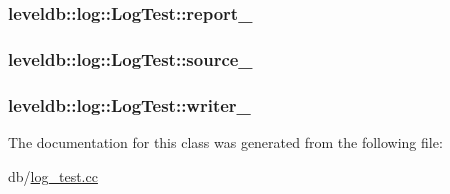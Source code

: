 \hypertarget{classleveldb_1_1log_1_1_log_test_a39e97d85a7494c9b8056c10e1124e374}{
\subsubsection[{report\-\_\-}]{ leveldb\-::log\-::\-Log\-Test\-::report\-\_\-\hspace{0.3cm}{\ttfamily [private]}}}\label{classleveldb_1_1log_1_1_log_test_a39e97d85a7494c9b8056c10e1124e374}
\hypertarget{classleveldb_1_1log_1_1_log_test_a6b1751fd9e549d4bce02afbeca392058}{
\subsubsection[{source\-\_\-}]{ leveldb\-::log\-::\-Log\-Test\-::source\-\_\-\hspace{0.3cm}{\ttfamily [private]}}}\label{classleveldb_1_1log_1_1_log_test_a6b1751fd9e549d4bce02afbeca392058}
\hypertarget{classleveldb_1_1log_1_1_log_test_a8b219478ee3bf6a34802c4ebca6fae6d}{
\subsubsection[{writer\-\_\-}]{ leveldb\-::log\-::\-Log\-Test\-::writer\-\_\-\hspace{0.3cm}{\ttfamily [private]}}}\label{classleveldb_1_1log_1_1_log_test_a8b219478ee3bf6a34802c4ebca6fae6d}


The documentation for this class was generated from the following file\-:\begin{DoxyCompactItemize}
\item 
db/\hyperlink{log__test_8cc}{log\-\_\-test.\-cc}\end{DoxyCompactItemize}
